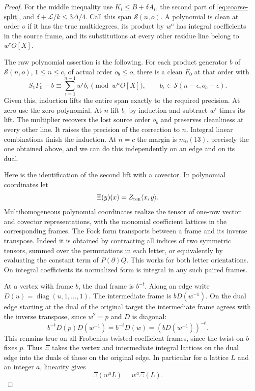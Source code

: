\begin{proof}
For
the middle inequality use \(K_i\le B+\delta A_i\), the second
part of \eqref{eq:coarse-split}, and
\(\delta+\mathcal L/k\le3\Delta/4\).
Call this span \(\mathcal S(n,o)\). A polynomial is clean at
order \(o\) if it has the true multidegrees, its product by
\(w^o\) has integral coefficients in the source frame, and
its substitutions at every other residue line belong to
\(w^c O[X]\).

The raw polynomial assertion is the following. For each
product generator \(b\) of \(\mathcal S(n,o)\), \(1\le n\le c\),
of actual order \(o_b\le o\), there is a clean \(F_0\)
at that order with
\begin{equation}\label{eq:raw-tail-required}
 S_1F_0-b\equiv\sum_{\epsilon=1}^{n-1}w^\epsilon b_\epsilon
 \pmod {w^nO[X]},\qquad
 b_\epsilon\in\mathcal S(n-\epsilon,o_b+\epsilon).
\end{equation}
Given this, induction lifts the entire span exactly to the
required precision. At zero use the zero polynomial. At \(n\)
lift \(b_\epsilon\) by induction and subtract \(w^\epsilon\)
times its lift. The multiplier recovers the lost source order
\(o_b\) and preserves cleanliness at every other line. It
raises the precision of the correction to \(n\). Integral
linear combinations finish the induction. At \(n=c\) the
margin is \(m_0(13)\), precisely the one obtained above, and
we can do this independently on an edge and on its dual.

Here is the identification of the second lift with a covector.
In polynomial coordinates let
\[
 \Xi(y)(x)=Z_{\rm ten}\langle x,y\rangle.
\]
Multihomogeneous polynomial coordinates realize
the tensor of one-row vector and covector representations,
with the monomial coefficient lattices in the corresponding
frames. The Fock form transports between a frame and its
inverse transpose. Indeed it is obtained by contracting
all indices of two symmetric tensors, summed over the
permutations in each letter, or equivalently by evaluating
the constant term of \(P(\partial)Q\). This works for both
letter orientations. On integral coefficients its normalized
form is integral in any such paired frames.

At a vertex
with frame \(b\), the dual frame is \(b^{-t}\). Along an edge
write \(D(u)=\operatorname{diag}(u,1,\ldots,1)\).
The intermediate frame is \(bD(w^{-1})\).
On the dual edge starting at the dual of the original target
the intermediate frame agrees with the inverse transpose, since
\(w^2=p\) and \(D\) is diagonal:
\[
 b^{-t}D(p)D(w^{-1})=b^{-t}D(w)=(bD(w^{-1}))^{-t}.
\] This remains true on all
Frobenius-twisted coefficient frames, since the twist on
\(b\) fixes \(p\). Thus \(\Xi\) takes the vertex and intermediate
integral lattices on the dual edge into the duals of those
on the original edge. In particular for a lattice \(L\) and an integer \(a\), linearity gives
\[
 \Xi(w^a L)=w^a\Xi(L).
\]


\end{proof}
